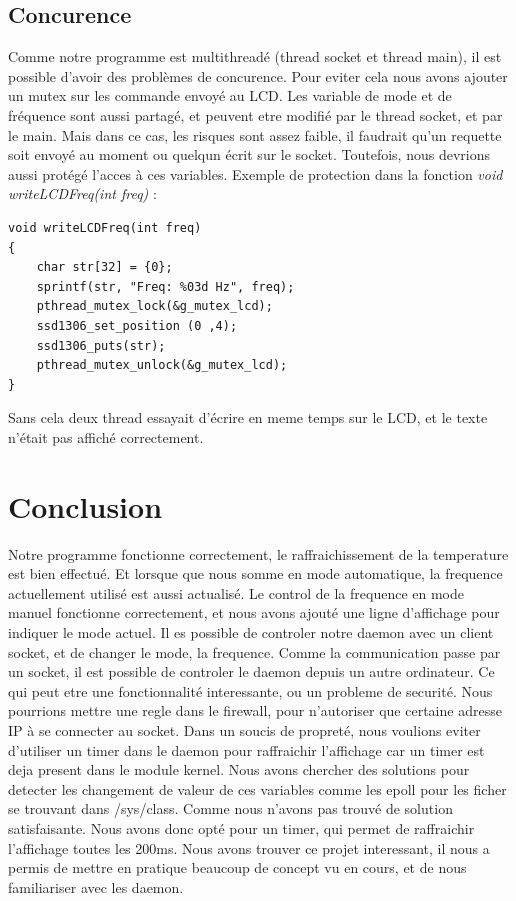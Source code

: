 \documentclass[
	a4paper, %
	10pt, %
]{CSUniSchoolLabReport}
\begin{document}
\subsection{Concurence}
Comme notre programme est multithreadé (thread socket et thread main), il est possible d'avoir des problèmes de concurence. Pour eviter cela nous avons ajouter un mutex sur les commande envoyé au LCD.
Les variable de mode et de fréquence sont aussi partagé, et peuvent etre modifié par le thread socket, et par le main. Mais dans ce cas, les risques sont assez faible, il faudrait qu'un requette soit envoyé au moment ou quelqun écrit sur le socket. Toutefois, nous devrions aussi protégé l'acces à ces variables.
Exemple de protection dans la fonction \textit{void writeLCDFreq(int freq)} : \\
\begin{lstlisting}[style=CStyle]
void writeLCDFreq(int freq)
{
    char str[32] = {0};
    sprintf(str, "Freq: %03d Hz", freq);
    pthread_mutex_lock(&g_mutex_lcd);
    ssd1306_set_position (0 ,4);
    ssd1306_puts(str);
    pthread_mutex_unlock(&g_mutex_lcd);
}
\end{lstlisting}
Sans cela deux thread essayait d'écrire en meme temps sur le LCD, et le texte n'était pas affiché correctement.

\section{Conclusion}
Notre programme fonctionne correctement, le raffraichissement de la temperature est bien effectué. Et lorsque que nous somme en mode automatique, la frequence actuellement utilisé est aussi actualisé.
Le control de la frequence en mode manuel fonctionne correctement, et nous avons ajouté une ligne d'affichage pour indiquer le mode actuel.
Il es possible de controler notre daemon avec un client socket, et de changer le mode, la frequence. Comme la communication passe par un socket, il est possible de controler le daemon depuis un autre ordinateur.
Ce qui peut etre une fonctionnalité interessante, ou un probleme de securité. Nous pourrions mettre une regle dans le firewall, pour n'autoriser que certaine adresse IP à se connecter au socket.
\linebreak
\linebreak
Dans un soucis de propreté, nous voulions eviter d'utiliser un timer dans le daemon pour raffraichir l'affichage car un timer est deja present dans le module kernel. Nous avons chercher des solutions pour detecter les changement de valeur de ces variables comme les epoll pour les ficher se trouvant dans /sys/class.
Comme nous n'avons pas trouvé de solution satisfaisante. Nous avons donc opté pour un timer, qui permet de raffraichir l'affichage toutes les 200ms.
Nous avons trouver ce projet interessant, il nous a permis de mettre en pratique beaucoup de concept vu en cours, et de nous familiariser avec les daemon.
\end{document}
